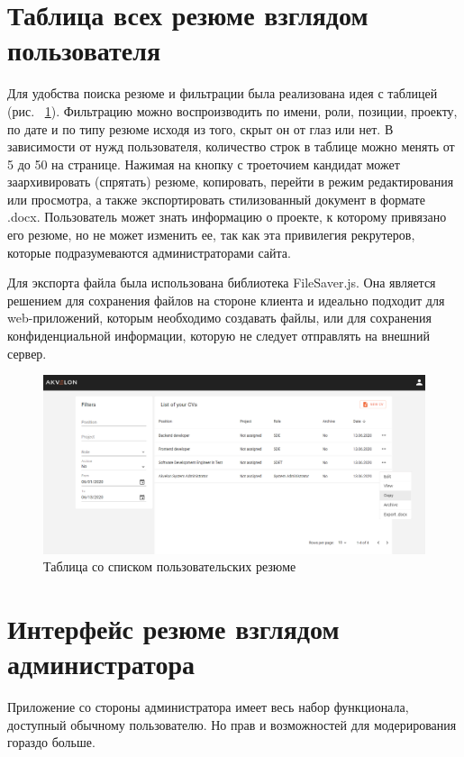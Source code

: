 \documentclass[12pt, a4paper]{diplom}
\begin{document}
\section{Таблица всех резюме взглядом пользователя}

Для удобства поиска резюме и фильтрации была реализована идея с таблицей (рис. ~\ref{14}). Фильтрацию можно воспроизводить по имени, роли, позиции,
проекту, по дате и по типу резюме исходя из того, скрыт он от глаз или нет. В зависимости от нужд пользователя, количество строк в таблице можно менять от 5 до 50 на странице.
Нажимая на кнопку с троеточием кандидат может заархивировать (спрятать) резюме, копировать, перейти в режим редактирования или просмотра, а также экспортировать
стилизованный документ в формате .docx. Пользователь может знать информацию о проекте, к которому привязано его резюме, но не может изменить ее, так как эта привилегия рекрутеров, которые подразумеваются
администраторами сайта.

Для экспорта файла была использована библиотека FileSaver.js. Она является решением для сохранения файлов на стороне клиента и идеально подходит для web-приложений, которым необходимо создавать файлы, или для сохранения конфиденциальной информации, которую не следует отправлять на внешний сервер.

\begin{figure}[!ht]
\centering
\includegraphics[width=1\textwidth]{resources/cvlistuser.png}
\caption{Таблица со списком пользовательских резюме}
\label{14}
\end{figure}

\section{Интерфейс резюме взглядом администратора}

Приложение со стороны администратора имеет весь набор функционала, доступный обычному пользователю. Но прав и возможностей для модерирования гораздо больше.
\end{document}
